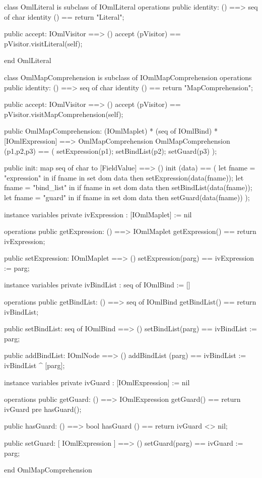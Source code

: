 \begin{vdm_al}
class OmlLiteral is subclass of IOmlLiteral
operations
  public identity: () ==> seq of char
  identity () == return "Literal";

  public accept: IOmlVisitor ==> ()
  accept (pVisitor) == pVisitor.visitLiteral(self);

end OmlLiteral
\end{vdm_al}
\begin{vdm_al}
class OmlMapComprehension is subclass of IOmlMapComprehension
operations
  public identity: () ==> seq of char
  identity () == return "MapComprehension";

  public accept: IOmlVisitor ==> ()
  accept (pVisitor) == pVisitor.visitMapComprehension(self);

  public OmlMapComprehension:
      (IOmlMaplet) *
      (seq of IOmlBind) *
      [IOmlExpression] ==> OmlMapComprehension
  OmlMapComprehension (p1,p2,p3) == 
   ( setExpression(p1);
     setBindList(p2);
     setGuard(p3) );

  public init: map seq of char to [FieldValue] ==> ()
  init (data) ==
    ( let fname = "expression" in
        if fname in set dom data
        then setExpression(data(fname));
      let fname = "bind_list" in
        if fname in set dom data
        then setBindList(data(fname));
      let fname = "guard" in
        if fname in set dom data
        then setGuard(data(fname)) );

instance variables
  private ivExpression : [IOmlMaplet] := nil

operations
  public getExpression: () ==> IOmlMaplet
  getExpression() == return ivExpression;

  public setExpression: IOmlMaplet ==> ()
  setExpression(parg) == ivExpression := parg;

instance variables
  private ivBindList : seq of IOmlBind := []

operations
  public getBindList: () ==> seq of IOmlBind
  getBindList() == return ivBindList;

  public setBindList: seq of IOmlBind ==> ()
  setBindList(parg) == ivBindList := parg;

  public addBindList: IOmlNode ==> ()
  addBindList (parg) == ivBindList := ivBindList ^ [parg];

instance variables
  private ivGuard : [IOmlExpression] := nil

operations
  public getGuard: () ==> IOmlExpression
  getGuard() == return ivGuard
    pre hasGuard();

  public hasGuard: () ==> bool
  hasGuard () == return ivGuard <> nil;

  public setGuard: [ IOmlExpression ] ==> ()
  setGuard(parg) == ivGuard := parg;

end OmlMapComprehension
\end{vdm_al}

